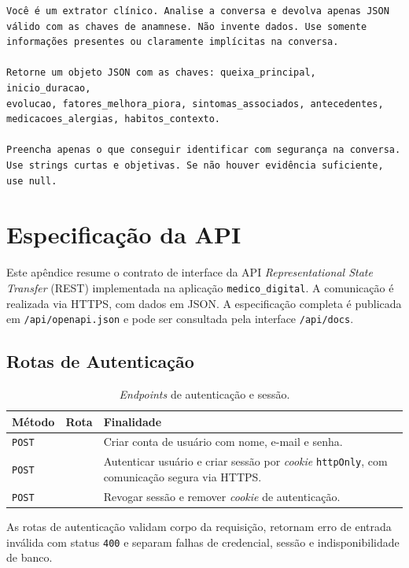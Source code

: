 \begin{apendicesenv}
\begin{verbatim}
Você é um extrator clínico. Analise a conversa e devolva apenas JSON 
válido com as chaves de anamnese. Não invente dados. Use somente 
informações presentes ou claramente implícitas na conversa.

Retorne um objeto JSON com as chaves: queixa_principal, inicio_duracao, 
evolucao, fatores_melhora_piora, sintomas_associados, antecedentes, 
medicacoes_alergias, habitos_contexto.

Preencha apenas o que conseguir identificar com segurança na conversa.
Use strings curtas e objetivas. Se não houver evidência suficiente, 
use null.
\end{verbatim}

\chapter{Especificação da API}
\label{ap:api}

Este apêndice resume o contrato de interface da API \textit{Representational State Transfer} (REST) implementada
na aplicação \texttt{medico\_digital}. A comunicação é realizada via HTTPS, com dados em JSON.
A especificação completa é publicada em \texttt{/api/openapi.json} e pode ser consultada pela
interface \texttt{/api/docs}.

\section{Rotas de Autenticação}

\begin{table}[htb]
\centering
\caption{\textit{Endpoints} de autenticação e sessão.}
\label{tab:api-auth}
\begin{tabularx}{\textwidth}{p{2.2cm}p{4.1cm}Y}
\hline
Método & Rota & Finalidade \\
\hline
\texttt{POST} &  & Criar conta de usuário com nome, e-mail e senha. \\
\texttt{POST} &  & Autenticar usuário e criar sessão por \textit{cookie} \texttt{httpOnly}, com comunicação segura via HTTPS. \\
\texttt{POST} &  & Revogar sessão e remover \textit{cookie} de autenticação. \\
\hline
\end{tabularx}
\end{table}

As rotas de autenticação validam corpo da requisição, retornam erro de entrada inválida com
status \texttt{400} e separam falhas de credencial, sessão e indisponibilidade de banco.


\end{apendicesenv}
